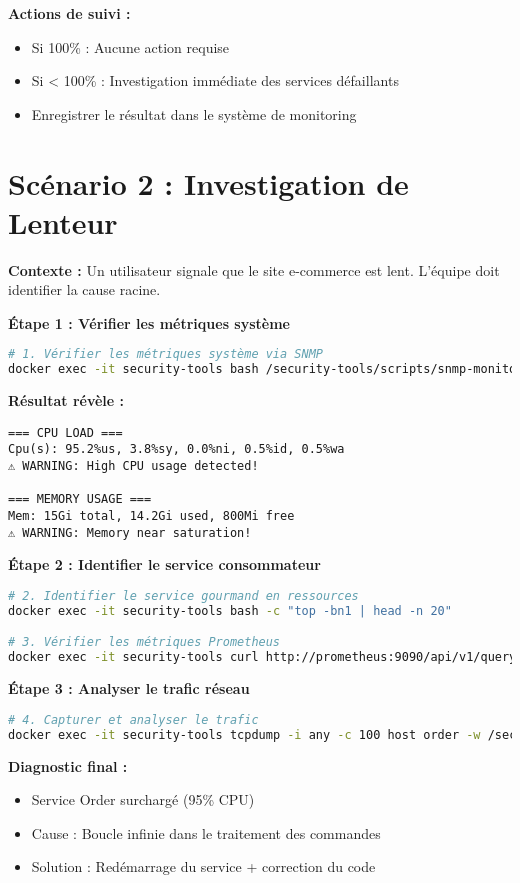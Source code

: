 \documentclass[11pt,a4paper]{report}
\begin{document}
\textbf{Actions de suivi :}
\begin{itemize}
    \item Si 100\% : Aucune action requise
    \item Si < 100\% : Investigation immédiate des services défaillants
    \item Enregistrer le résultat dans le système de monitoring
\end{itemize}

\section{Scénario 2 : Investigation de Lenteur}

\textbf{Contexte :} Un utilisateur signale que le site e-commerce est lent. L'équipe doit identifier la cause racine.

\textbf{Étape 1 : Vérifier les métriques système}
\begin{lstlisting}[language=bash, caption=Analyse des Performances Système]
# 1. Vérifier les métriques système via SNMP
docker exec -it security-tools bash /security-tools/scripts/snmp-monitor.sh
\end{lstlisting}

\textbf{Résultat révèle :}
\begin{lstlisting}[basicstyle=\ttfamily\tiny]
=== CPU LOAD ===
Cpu(s): 95.2%us, 3.8%sy, 0.0%ni, 0.5%id, 0.5%wa
⚠ WARNING: High CPU usage detected!

=== MEMORY USAGE ===
Mem: 15Gi total, 14.2Gi used, 800Mi free
⚠ WARNING: Memory near saturation!
\end{lstlisting}

\textbf{Étape 2 : Identifier le service consommateur}
\begin{lstlisting}[language=bash]
# 2. Identifier le service gourmand en ressources
docker exec -it security-tools bash -c "top -bn1 | head -n 20"

# 3. Vérifier les métriques Prometheus
docker exec -it security-tools curl http://prometheus:9090/api/v1/query?query=rate(cpu_usage[5m])
\end{lstlisting}

\textbf{Étape 3 : Analyser le trafic réseau}
\begin{lstlisting}[language=bash]
# 4. Capturer et analyser le trafic
docker exec -it security-tools tcpdump -i any -c 100 host order -w /security-tools/reports/traffic.pcap
\end{lstlisting}

\textbf{Diagnostic final :}
\begin{itemize}
    \item Service Order surchargé (95\% CPU)
    \item Cause : Boucle infinie dans le traitement des commandes
    \item Solution : Redémarrage du service + correction du code
\end{itemize}
\end{document}
